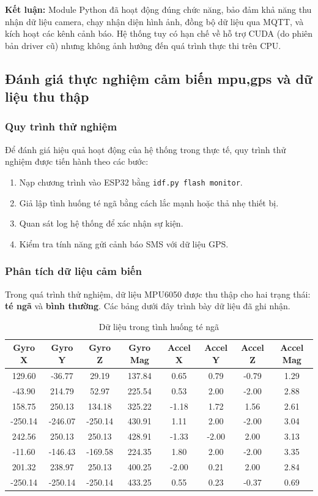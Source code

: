 \textbf{Kết luận:} Module Python đã hoạt động đúng chức năng, bảo đảm khả năng thu nhận dữ liệu camera, chạy nhận diện hình ảnh, đồng bộ dữ liệu qua MQTT, và kích hoạt các kênh cảnh báo. Hệ thống tuy có hạn chế về hỗ trợ CUDA (do phiên bản driver cũ) nhưng không ảnh hưởng đến quá trình thực thi trên CPU.

\subsection{Đánh giá thực nghiệm cảm biến mpu,gps và dữ liệu thu thập}
\subsubsection*{Quy trình thử nghiệm}
Để đánh giá hiệu quả hoạt động của hệ thống trong thực tế, quy trình thử nghiệm được tiến hành theo các bước:
\begin{enumerate}
    \item Nạp chương trình vào ESP32 bằng \texttt{idf.py flash monitor}.  
    \item Giả lập tình huống té ngã bằng cách lắc mạnh hoặc thả nhẹ thiết bị.  
    \item Quan sát log hệ thống để xác nhận sự kiện.  
    \item Kiểm tra tính năng gửi cảnh báo SMS với dữ liệu GPS.  
\end{enumerate}

\subsubsection*{Phân tích dữ liệu cảm biến}
Trong quá trình thử nghiệm, dữ liệu MPU6050 được thu thập cho hai trạng thái: \textbf{té ngã} và \textbf{bình thường}.  
Các bảng dưới đây trình bày dữ liệu đã ghi nhận.

\begin{table}[H]
\centering
\caption{Dữ liệu trong tình huống té ngã}
\label{tab:fall_data}
\begin{tabular}{|c|c|c|c|c|c|c|c|}
\hline
\textbf{Gyro X} & \textbf{Gyro Y} & \textbf{Gyro Z} & \textbf{Gyro Mag} & \textbf{Accel X} & \textbf{Accel Y} & \textbf{Accel Z} & \textbf{Accel Mag} \\
\hline
129.60 & -36.77 & 29.19 & 137.84 & 0.65 & 0.79 & -0.79 & 1.29 \\
-43.90 & 214.79 & 52.97 & 225.54 & 0.53 & 2.00 & -2.00 & 2.88 \\
158.75 & 250.13 & 134.18 & 325.22 & -1.18 & 1.72 & 1.56 & 2.61 \\
-250.14 & -246.07 & -250.14 & 430.91 & 1.11 & 2.00 & -2.00 & 3.04 \\
242.56 & 250.13 & 250.13 & 428.91 & -1.33 & -2.00 & 2.00 & 3.13 \\
-11.60 & -146.43 & -169.58 & 224.35 & 1.80 & 2.00 & -2.00 & 3.35 \\
201.32 & 238.97 & 250.13 & 400.25 & -2.00 & 0.21 & 2.00 & 2.84 \\
-250.14 & -250.14 & -250.14 & 433.25 & 0.55 & 0.23 & -0.37 & 0.69 \\
\hline
\end{tabular}
\end{table}

